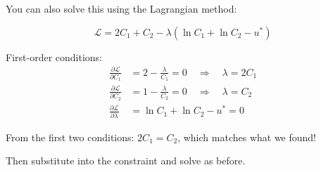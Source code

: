 \documentclass[12pt]{article}
\begin{document}
You can also solve this using the Lagrangian method:

\[\mathcal{L} = 2C_1 + C_2 - \lambda(\ln C_1 + \ln C_2 - u^*)\]

First-order conditions:
\begin{align*}
\frac{\partial \mathcal{L}}{\partial C_1} &= 2 - \frac{\lambda}{C_1} = 0 \quad \Rightarrow \quad \lambda = 2C_1 \\
\frac{\partial \mathcal{L}}{\partial C_2} &= 1 - \frac{\lambda}{C_2} = 0 \quad \Rightarrow \quad \lambda = C_2 \\
\frac{\partial \mathcal{L}}{\partial \lambda} &= \ln C_1 + \ln C_2 - u^* = 0
\end{align*}

From the first two conditions: $2C_1 = C_2$, which matches what we found!

Then substitute into the constraint and solve as before.
\end{document}
